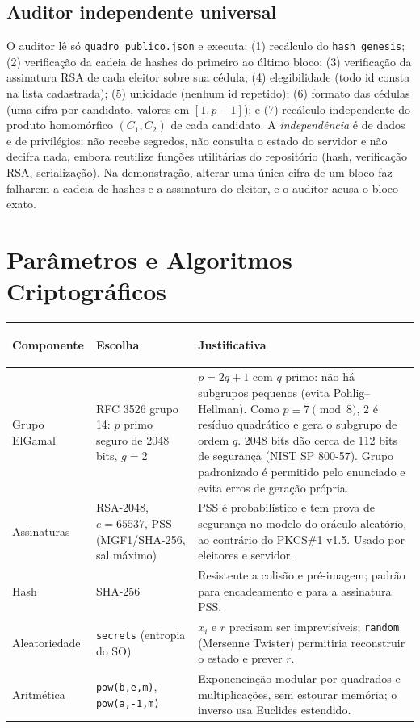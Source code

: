 \documentclass[11pt,a4paper]{article}
\begin{document}
\subsection{Auditor independente universal}
O auditor lê só \texttt{quadro\_publico.json} e executa: (1) recálculo do \texttt{hash\_genesis}; (2) verificação da cadeia de hashes do primeiro ao último bloco; (3) verificação da assinatura RSA de cada eleitor sobre sua cédula; (4) elegibilidade (todo id consta na lista cadastrada); (5) unicidade (nenhum id repetido); (6) formato das cédulas (uma cifra por candidato, valores em $[1,p-1]$); e (7) recálculo independente do produto homomórfico $(C_1,C_2)$ de cada candidato. A \emph{independência} é de dados e de privilégios: não recebe segredos, não consulta o estado do servidor e não decifra nada, embora reutilize funções utilitárias do repositório (hash, verificação RSA, serialização). Na demonstração, alterar uma única cifra de um bloco faz falharem a cadeia de hashes e a assinatura do eleitor, e o auditor acusa o bloco exato.

\section{Parâmetros e Algoritmos Criptográficos}
\begin{tabularx}{\textwidth}{@{}>{\bfseries\raggedright\arraybackslash}p{2.7cm}p{4.2cm}Y@{}}
\toprule
Componente & Escolha & Justificativa\\
\midrule
Grupo ElGamal & RFC 3526 grupo 14: $p$ primo seguro de 2048 bits, $g=2$ &
$p=2q+1$ com $q$ primo: não há subgrupos pequenos (evita Pohlig--Hellman). Como $p\equiv7\pmod 8$, $2$ é resíduo quadrático e gera o subgrupo de ordem $q$. 2048 bits dão cerca de 112 bits de segurança (NIST SP 800-57). Grupo padronizado é permitido pelo enunciado e evita erros de geração própria.\\
Assinaturas & RSA-2048, $e=65537$, PSS (MGF1/SHA-256, sal máximo) &
PSS é probabilístico e tem prova de segurança no modelo do oráculo aleatório, ao contrário do PKCS\#1 v1.5. Usado por eleitores e servidor.\\
Hash & SHA-256 &
Resistente a colisão e pré-imagem; padrão para encadeamento e para a assinatura PSS.\\
Aleatoriedade & \texttt{secrets} (entropia do SO) &
$x_i$ e $r$ precisam ser imprevisíveis; \texttt{random} (Mersenne Twister) permitiria reconstruir o estado e prever $r$.\\
Aritmética & \texttt{pow(b,e,m)}, \texttt{pow(a,-1,m)} &
Exponenciação modular por quadrados e multiplicações, sem estourar memória; o inverso usa Euclides estendido.\\
\bottomrule
\end{tabularx}
\end{document}
